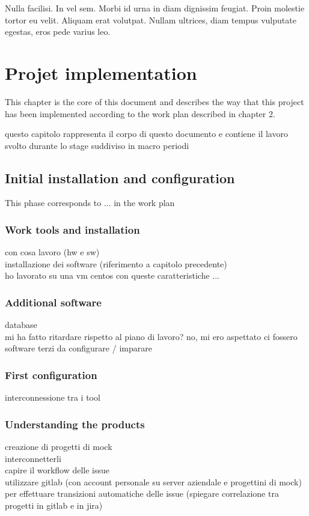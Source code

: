 \begin{savequote}[75mm]
Nulla facilisi. In vel sem. Morbi id urna in diam dignissim feugiat. Proin molestie tortor eu velit. Aliquam erat volutpat. Nullam ultrices, diam tempus vulputate egestas, eros pede varius leo.
\end{savequote}

\chapter{Projet implementation}

This chapter is the core of this document and describes the way that this project has been implemented according to the work plan described in chapter 2.

questo capitolo rappresenta il corpo di questo documento e contiene il lavoro svolto durante lo stage suddiviso in macro periodi

\section{Initial installation and configuration}

	This phase corresponds to ... in the work plan
	
	\subsection{Work tools and installation}
		con cosa lavoro (hw e sw)\\
		installazione dei software (riferimento a capitolo precedente)\\
		ho lavorato su una vm centos con queste caratteristiche ...
		
	\subsection{Additional software}
		database\\
		mi ha fatto ritardare rispetto al piano di lavoro? no, mi ero aspettato ci fossero software terzi da configurare / imparare
	
	\subsection{First configuration}
		interconnessione tra i tool
	
	\subsection{Understanding the products}
		creazione di progetti di mock\\
		interconnetterli\\
		capire il workflow delle issue\\
		utilizzare gitlab (con account personale su server aziendale e progettini di mock) per effettuare transizioni automatiche delle issue (spiegare correlazione tra progetti in gitlab e in jira)

